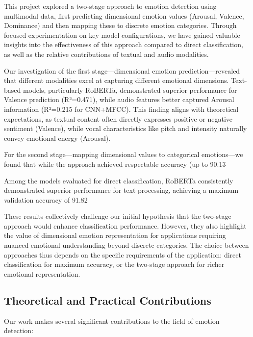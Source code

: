 \documentclass[12pt]{article}
\begin{document}
This project explored a two-stage approach to emotion detection using multimodal data, first predicting dimensional emotion values (Arousal, Valence, Dominance) and then mapping these to discrete emotion categories. Through focused experimentation on key model configurations, we have gained valuable insights into the effectiveness of this approach compared to direct classification, as well as the relative contributions of textual and audio modalities.

Our investigation of the first stage—dimensional emotion prediction—revealed that different modalities excel at capturing different emotional dimensions. Text-based models, particularly RoBERTa, demonstrated superior performance for Valence prediction (R²=0.471), while audio features better captured Arousal information (R²=0.215 for CNN+MFCC). This finding aligns with theoretical expectations, as textual content often directly expresses positive or negative sentiment (Valence), while vocal characteristics like pitch and intensity naturally convey emotional energy (Arousal).

For the second stage—mapping dimensional values to categorical emotions—we found that while the approach achieved respectable accuracy (up to 90.13%

Among the models evaluated for direct classification, RoBERTa consistently demonstrated superior performance for text processing, achieving a maximum validation accuracy of 91.82%

These results collectively challenge our initial hypothesis that the two-stage approach would enhance classification performance. However, they also highlight the value of dimensional emotion representation for applications requiring nuanced emotional understanding beyond discrete categories. The choice between approaches thus depends on the specific requirements of the application: direct classification for maximum accuracy, or the two-stage approach for richer emotional representation.

\subsection{Theoretical and Practical Contributions}
Our work makes several significant contributions to the field of emotion detection:
\end{document}
